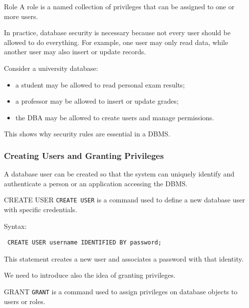  \begin{defbox}{Role}
  A role is a named collection of privileges that can be assigned to one or more users.
 \end{defbox}

 In practice, database security is necessary because not every user should be allowed to do everything. For example, one user may only read data, while another user may also insert or update records.

 \begin{example}
  Consider a university database:
  \begin{itemize}
   \item a student may be allowed to read personal exam results;
   \item a professor may be allowed to insert or update grades;
   \item the DBA may be allowed to create users and manage permissions.
  \end{itemize}

  This shows why security rules are essential in a DBMS.
 \end{example}

 \subsubsection{Creating Users and Granting Privileges}

 A database user can be created so that the system can uniquely identify and authenticate a person or an application accessing the DBMS.

 \begin{defbox}{CREATE USER}
  \texttt{CREATE USER} is a command used to define a new database user with specific credentials.
 \end{defbox}

 Syntax:

 \begin{verbatim}
 CREATE USER username IDENTIFIED BY password;
 \end{verbatim}
 \vspace{-0.4cm}

 This statement creates a new user and associates a password with that identity.

We need to introduce also the idea of granting privileges.

 \begin{defbox}{GRANT}
  \texttt{GRANT} is a command used to assign privileges on database objects to users or roles.
 \end{defbox}

